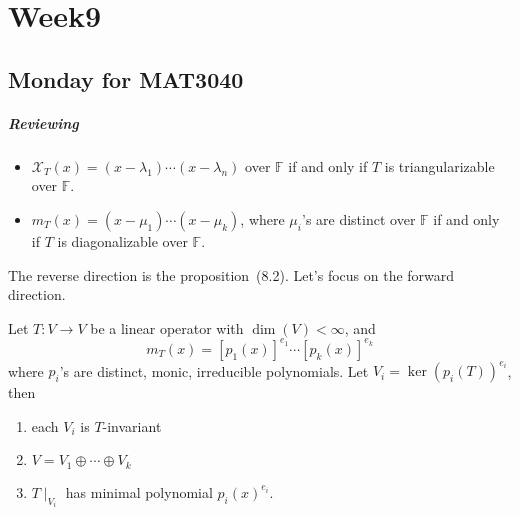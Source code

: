 \chapter{Week9}
\section{Monday for MAT3040}
\paragraph{Reviewing}
\begin{itemize}
\item
$\mathcal{X}_T(x) = (x-\lambda_1)\cdots(x-\lambda_n)$ over $\mathbb{F}$ if and only if $T$ is triangularizable over $\mathbb{F}$.
\item
$m_T(x) = (x-\mu_1)\cdots(x-\mu_k)$, where $\mu_i$'s are distinct over $\mathbb{F}$ if and only if $T$ is diagonalizable over $\mathbb{F}$.
\end{itemize}
The reverse direction is the proposition~(8.2). Let's focus on the forward direction.

\begin{theorem}
Let $T:V\to V$ be a linear operator with $\dim(V)<\infty$, and
\[
m_T(x) = [p_1(x)]^{e_1}\cdots[p_k(x)]^{e_k}
\]
where $p_i$'s are distinct, monic, irreducible polynomials.
Let $V_i=\ker(p_i(T))^{e_i}$, then
\begin{enumerate}
\item
each $V_i$ is $T$-invariant
\item
$V=V_1\oplus\cdots\oplus V_k$
\item
$T\mid_{V_i}$ has minimal polynomial $p_i(x)^{e_i}$.
\end{enumerate}
\end{theorem}

